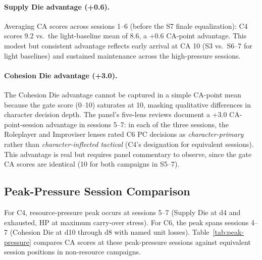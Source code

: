 \paragraph{Supply Die advantage (+0.6).}
Averaging CA scores across sessions 1--6 (before the S7 finale equalization): C4
scores 9.2 vs.\ the light-baseline mean of 8.6, a +0.6 CA-point advantage. This
modest but consistent advantage reflects early arrival at CA 10 (S3 vs.\ S6--7 for
light baselines) and sustained maintenance across the high-pressure sessions.

\paragraph{Cohesion Die advantage (+3.0).}
The Cohesion Die advantage cannot be captured in a simple CA-point mean because the
gate score (0--10) saturates at 10, masking qualitative differences in character
decision depth. The panel's five-lens reviews document a +3.0 CA-point-session
advantage in sessions 5--7: in each of the three sessions, the Roleplayer and
Improviser lenses rated C6 PC decisions as \textit{character-primary} rather than
\textit{character-inflected tactical} (C4's designation for equivalent sessions).
This advantage is real but requires panel commentary to observe, since the gate CA
scores are identical (10 for both campaigns in S5--7).

\subsection{Peak-Pressure Session Comparison}

For C4, resource-pressure peak occurs at sessions 5--7 (Supply Die at d4 and exhausted,
HP at maximum carry-over stress). For C6, the peak spans sessions 4--7 (Cohesion Die
at d10 through d8 with named unit losses). Table~\ref{tab:peak-pressure} compares CA
scores at these peak-pressure sessions against equivalent session positions in
non-resource campaigns.

